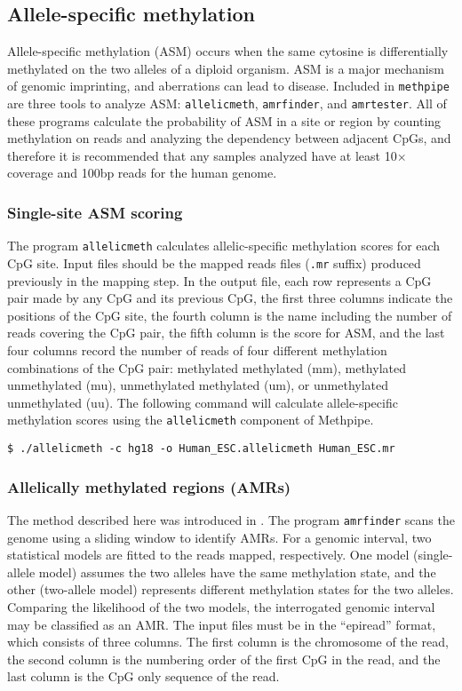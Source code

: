 \documentclass[10pt]{article}
\newcommand{\prog}[1]{\texttt{#1}}
\newcommand{\fn}[1]{\texttt{#1}}
\begin{document}
\subsection{Allele-specific methylation}

Allele-specific methylation (ASM) occurs when the same cytosine is
differentially methylated on the two alleles of a diploid organism.
ASM is a major mechanism of genomic imprinting, and aberrations can
lead to disease. Included in \prog{methpipe} are three tools to
analyze ASM: \prog{allelicmeth}, \prog{amrfinder}, and \prog{amrtester}.
All of these programs calculate the probability of ASM in a site or
region by counting methylation on reads and analyzing the dependency
between adjacent CpGs, and therefore it is recommended that any samples
analyzed have at least 10$\times$ coverage and 100bp reads for the human
genome.

\subsubsection{Single-site ASM scoring}
\label{sec:allelic_scores}

The program \prog{allelicmeth} calculates allelic-specific methylation
scores for each CpG site. Input files should be the mapped reads files
(\fn{.mr} suffix) produced previously in the mapping step. In the
output file, each row represents a CpG pair made by any CpG and its
previous CpG, the first three columns indicate the positions of the
CpG site, the fourth column is the name including the number of reads
covering the CpG pair, the fifth column is the score for ASM, and the
last four columns record the number of reads of four different
methylation combinations of the CpG pair: methylated methylated (mm),
methylated unmethylated (mu), unmethylated methylated (um), or
unmethylated unmethylated (uu). The following command will calculate
allele-specific methylation scores using the \prog{allelicmeth}
component of Methpipe.

\begin{verbatim}
$ ./allelicmeth -c hg18 -o Human_ESC.allelicmeth Human_ESC.mr
\end{verbatim}

\subsubsection{Allelically methylated regions (AMRs)}

The method described here was introduced in \cite{fang2012genomic}.
The program \prog{amrfinder} scans the genome using a sliding window
to identify AMRs. For a genomic interval, two statistical models are
fitted to the reads mapped, respectively. One model (single-allele
model) assumes the two alleles have the same methylation state, and
the other (two-allele model) represents different methylation states
for the two alleles. Comparing the likelihood of the two models, the
interrogated genomic interval may be classified as an AMR. The input
files must be in the ``epiread'' format, which consists of three
columns. The first column is the chromosome of the read, the second
column is the numbering order of the first CpG in the read, and the
last column is the CpG only sequence of the read.
\end{document}
